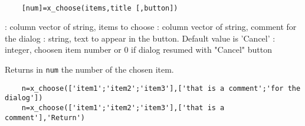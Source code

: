 
\begin{mandesc}
  \\ %
\end{mandesc}
\begin{calling_sequence}
  \begin{verbatim}
    [num]=x_choose(items,title [,button])   
  \end{verbatim}
\end{calling_sequence}
\begin{parameters}
  \begin{varlist}
    : column vector of string,  items to choose
    : column vector of string, comment for the dialog
    :  string, text to appear in the button. Default value is 'Cancel'
    : integer, choosen item number or 0 if dialog resumed with "Cancel" button
  \end{varlist}
\end{parameters}
\begin{mandescription}
  Returns in \verb!num! the number of the chosen item.
\end{mandescription}

\begin{examples}
  \begin{Verbatim}
    n=x_choose(['item1';'item2';'item3'],['that is a comment';'for the dialog'])
    n=x_choose(['item1';'item2';'item3'],['that is a comment'],'Return')
  \end{Verbatim}
\end{examples}
\begin{manseealso}
\end{manseealso}

